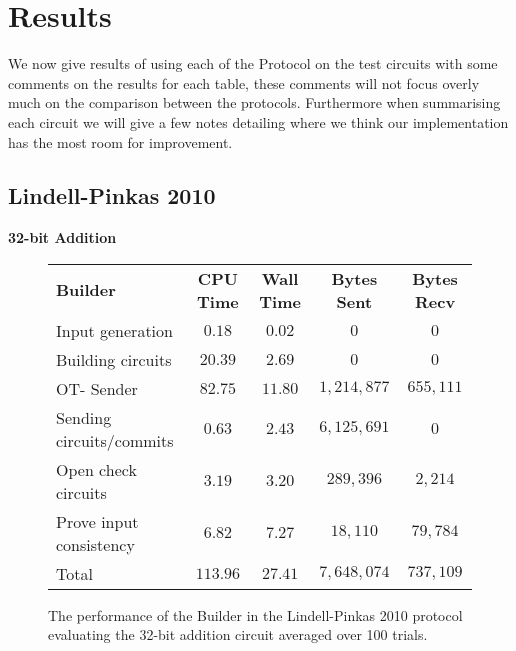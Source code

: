 \documentclass[ %
                    author={Nicholas Tutte},
                supervisor={Prof. Nigel Smart},
                    degree={MEng},
                     title={Secure Two Party Computation},
                  subtitle={A practical comparison of recent protocols},
                      type={Research - GG1K},
                      year={2015} ]{dissertation}
\begin{document}
		\section{Results}
			We now give results of using each of the Protocol on the test circuits with some comments on the results for each table, these comments will not focus overly much on the comparison between the protocols. Furthermore when summarising each circuit we will give a few notes detailing where we think our implementation has the most room for improvement.

			\FloatBarrier
			\subsection{Lindell-Pinkas 2010} \label{sub:LP_2010_Results_Analysis}

				\FloatBarrier
				\noindent \textbf{32-bit Addition}
				\begin{figure}[!ht]
					\begin{tabular}{| p{4.3cm} | c c c c |}
						\hline
						\textbf{Builder} & \textbf{CPU Time} & \textbf{Wall Time} & \textbf{Bytes Sent} & \textbf{Bytes Recv} \\
						\thickhline
						Input generation & $0.18$ & $0.02$ & $0$ & $0$ \\
						\hline
						Building circuits & $20.39$ & $2.69$ & $0$ & $0$ \\
						\hline
						OT- Sender & $82.75$ & $11.80$ & $1,214,877$ & $655,111$ \\
						\hline
						Sending circuits/commits & $0.63$ & $2.43$ & $6,125,691$ & $0$ \\
						\hline
						Open check circuits & $3.19$ & $3.20$ & $289,396$ & $2,214$ \\
						\hline
						Prove input consistency & $6.82$ & $7.27$ & $18,110$ & $79,784$ \\
						\thickhline
						Total & $113.96$ & $27.41$ & $7,648,074$ & $737,109$ \\
						\hline
					\end{tabular}
					\caption{The performance of the Builder in the Lindell-Pinkas 2010 protocol evaluating the 32-bit addition circuit averaged over 100 trials. \label{table:LP_2010_Add_Builder}}
				\end{figure}
					
\end{document}
